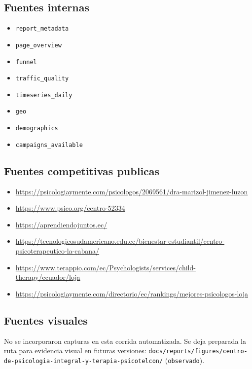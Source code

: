 \documentclass[9pt,a4paper,twocolumn,twoside]{tau-class/tau}
\begin{document}
\subsection{Fuentes internas}
\begin{itemize}
  \item \texttt{report\_metadata}
  \item \texttt{page\_overview}
  \item \texttt{funnel}
  \item \texttt{traffic\_quality}
  \item \texttt{timeseries\_daily}
  \item \texttt{geo}
  \item \texttt{demographics}
  \item \texttt{campaigns\_available}
\end{itemize}

\subsection{Fuentes competitivas publicas}
\begin{itemize}
  \item \url{https://psicologiaymente.com/psicologos/2069561/dra-marizol-jimenez-luzon}
  \item \url{https://www.psico.org/centro-52334}
  \item \url{https://aprendiendojuntos.ec/}
  \item \url{https://tecnologicosudamericano.edu.ec/bienestar-estudiantil/centro-psicoterapeutico-la-cabana/}
  \item \url{https://www.terappio.com/ec/Psychologists/services/child-therapy/ecuador/loja}
  \item \url{https://psicologiaymente.com/directorio/ec/rankings/mejores-psicologos-loja}
\end{itemize}

\subsection{Fuentes visuales}
No se incorporaron capturas en esta corrida automatizada. Se deja preparada la ruta para evidencia visual en futuras versiones:
\texttt{docs/reports/figures/centro-de-psicologia-integral-y-terapia-psicotelcon/} (\texttt{observado}).
\end{document}
